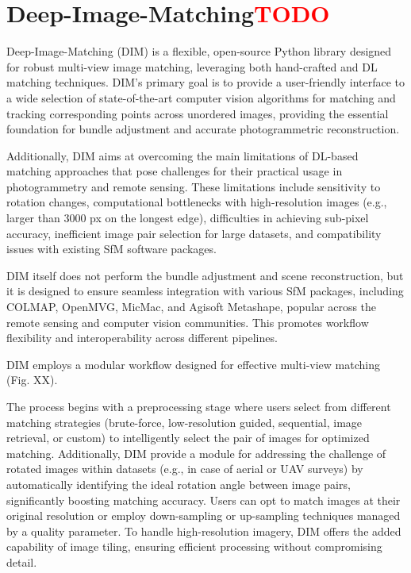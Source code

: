 \section{Deep-Image-Matching\textcolor{red}{TODO}}

Deep-Image-Matching (DIM) is a flexible, open-source Python library designed for robust multi-view image matching, leveraging both hand-crafted and DL matching techniques. DIM's primary goal is to provide a user-friendly interface to a wide selection of state-of-the-art computer vision algorithms for matching and tracking corresponding points across unordered images, providing the essential foundation for bundle adjustment and accurate photogrammetric reconstruction. 

Additionally, DIM aims at overcoming the main limitations of DL-based matching approaches that pose challenges for their practical usage in photogrammetry and remote sensing. These limitations include sensitivity to rotation changes, computational bottlenecks with high-resolution images (e.g., larger than 3000 px on the longest edge), difficulties in achieving sub-pixel accuracy, inefficient image pair selection for large datasets, and compatibility issues with existing SfM software packages.  

DIM itself does not perform the bundle adjustment and scene reconstruction, but it is designed to ensure seamless integration with various SfM packages, including COLMAP, OpenMVG, MicMac, and Agisoft Metashape, popular across the remote sensing and computer vision communities. This promotes workflow flexibility and interoperability across different pipelines. 

DIM employs a modular workflow designed for effective multi-view matching (Fig. XX).  

The process begins with a preprocessing stage where users select from different matching strategies (brute-force, low-resolution guided, sequential, image retrieval, or custom) to intelligently select the pair of images for optimized matching. Additionally, DIM provide a module for addressing the challenge of rotated images within datasets (e.g., in case of aerial or UAV surveys) by automatically identifying the ideal rotation angle between image pairs, significantly boosting matching accuracy. Users can opt to match images at their original resolution or employ down-sampling or up-sampling techniques managed by a quality parameter. To handle high-resolution imagery, DIM offers the added capability of image tiling, ensuring efficient processing without compromising detail. 

